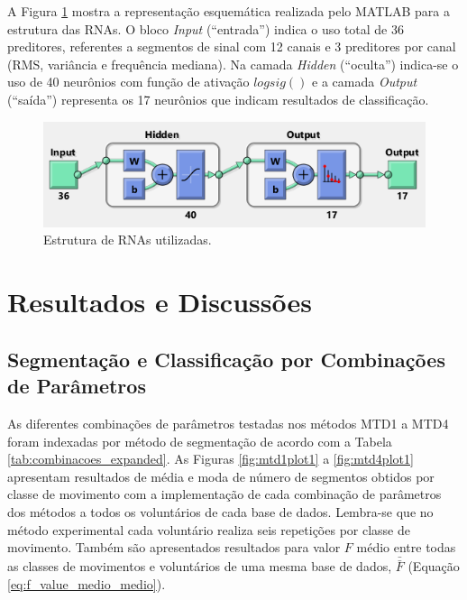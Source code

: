 A Figura \ref{fig:matlabRNA} mostra a representação esquemática realizada pelo MATLAB para a estrutura das RNAs. O bloco \emph{Input} (``entrada'') indica o uso total de 36 preditores, referentes a segmentos de sinal com 12 canais e 3 preditores por canal (RMS, variância e frequência mediana). Na camada \emph{Hidden} (``oculta'') indica-se o uso de 40 neurônios com função de ativação $logsig()$ e a camada \emph{Output} (``saída'') representa os 17 neurônios que indicam resultados de classificação.

\begin{figure}[htb]
	\caption{\label{fig:matlabRNA}Estrutura de RNAs utilizadas.}
	\begin{center}
	    \includegraphics[width=0.75\linewidth]{./img/matlabRNA.png}
	\end{center}
\end{figure}


	\chapter{Resultados e Discussões}
		\section{Segmentação e Classificação por Combinações de Parâmetros}
As diferentes combinações de parâmetros testadas nos métodos MTD1 a MTD4 foram indexadas por método de segmentação de acordo com a Tabela \ref{tab:combinacoes_expanded}. As Figuras \ref{fig:mtd1plot1} a \ref{fig:mtd4plot1} apresentam resultados de média e moda de número de segmentos obtidos por classe de movimento com a implementação de cada combinação de parâmetros dos métodos a todos os voluntários de cada base de dados. Lembra-se que no método experimental cada voluntário realiza seis repetições por classe de movimento. Também são apresentados resultados para valor $F$ médio entre todas as classes de movimentos e voluntários de uma mesma base de dados, $\bar{\bar{F}}$ (Equação \ref{eq:f_value_medio_medio}).

